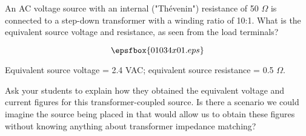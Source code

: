 

An AC voltage source with an internal ("Th\'evenin") resistance of 50 $\Omega$ is connected to a step-down transformer with a winding ratio of 10:1.  What is the equivalent source voltage and resistance, as seen from the load terminals?

$$\epsfbox{01034x01.eps}$$







Equivalent source voltage = 2.4 VAC; equivalent source resistance = 0.5 $\Omega$.







Ask your students to explain how they obtained the equivalent voltage and current figures for this transformer-coupled source.  Is there a scenario we could imagine the source being placed in that would allow us to obtain these figures without knowing anything about transformer impedance matching?




